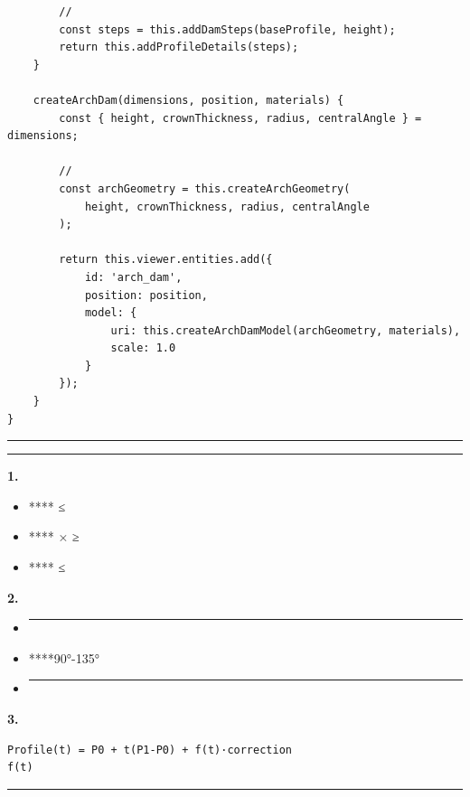 \begin{verbatim}
        // 
        const steps = this.addDamSteps(baseProfile, height);
        return this.addProfileDetails(steps);
    }
    
    createArchDam(dimensions, position, materials) {
        const { height, crownThickness, radius, centralAngle } = dimensions;
        
        // 
        const archGeometry = this.createArchGeometry(
            height, crownThickness, radius, centralAngle
        );
        
        return this.viewer.entities.add({
            id: 'arch_dam',
            position: position,
            model: {
                uri: this.createArchDamModel(archGeometry, materials),
                scale: 1.0
            }
        });
    }
}
\end{verbatim}

\begin{center}\rule{0.5\linewidth}{0.5pt}\end{center}

\begin{center}\rule{0.5\linewidth}{0.5pt}\end{center}

\textbf{1. }

\begin{itemize}
\tightlist
\item
  **** ≤
\item
  **** × ≥
\item
  **** ≤
\end{itemize}

\textbf{2. }

\begin{itemize}
\item
  \begin{center}\rule{0.5\linewidth}{0.5pt}\end{center}
\item
  ****90°-135°
\item
  \begin{center}\rule{0.5\linewidth}{0.5pt}\end{center}
\end{itemize}

\textbf{3. }

\begin{verbatim}
Profile(t) = P0 + t(P1-P0) + f(t)·correction
f(t)
\end{verbatim}

\begin{center}\rule{0.5\linewidth}{0.5pt}\end{center}


